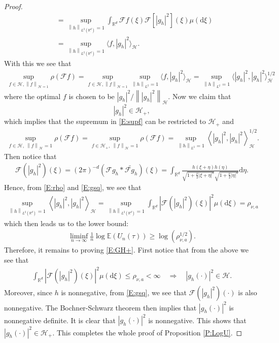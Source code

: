 \documentclass[a4paper,11pt]{article}
\numberwithin{equation}{section}
\numberwithin{equation}{section}
\theoremstyle{plain}
\theoremstyle{definition}
\newcommand{\ud}{\ensuremath{\mathrm{d} }}
\newcommand{\Norm}[1]{\left\|  #1   \right\|}
\newcommand{\R}{\mathbb{R}}
\begin{document}
\begin{proof}
\begin{align*}
                       & = \sup_{\Norm{h}_{L^2(\R^d)}=1} \int_{\R^d}\mathcal{F}f(\xi)\mathcal{F}[|g_h|^2](\xi) \mu(\ud \xi)                                   \\
                       & = \sup_{\Norm{h}_{L^2(\R^d)}=1}\langle f, |g_h|^2 \rangle _{\mathcal{H}}.
	\end{align*}
  With this we see that
	\begin{align}
		\label{E:supf}
		\sup_{ f\in \mathcal{H}, \Norm{f}_{\mathcal{H}=1} } \rho(\mathcal{F}f) = 	\sup_{ f\in \mathcal{H}, \Norm{f}_{\mathcal{H}=1} }\sup_{\Norm{h}_{L^2}=1} \langle f, |g_h|^2 \rangle _{\mathcal{H}} = \sup_{\Norm{h}_{L^2}=1} \langle |g_h|^2, |g_h|^2 \rangle^{1/2} _{\mathcal{H}}
	\end{align}
  where the optimal $f$ is chosen to be $|g_h|^2/\Norm{|g_h|^2}_{\mathcal{H}}$. Now we claim that
	\begin{equation}
		\label{E:GH+}
		|g_h|^2 \in \mathcal{H}_+,
	\end{equation}
  which implies that the supremum in \eqref{E:supf} can be restricted to $\mathcal{H}_+$ and
	\begin{align*}
		\sup_{ f \in \mathcal{H},\: \Norm{f}_{\mathcal{H}}=1 } \rho(\mathcal{F}f) =
		\sup_{ f \in \mathcal{H}_+,\: \Norm{f}_{\mathcal{H}}=1 } \rho(\mathcal{F}f) =
		\sup_{\Norm{h}_{L^2}=1} \left\langle |g_h|^2, |g_h|^2 \right\rangle^{1/2} _{\mathcal{H}}.
	\end{align*}
  Then notice that
	\begin{align}
		\label{E:gsq}
		\mathcal{F}( |g_h|^2 )(\xi) = (2\pi)^{-d} (\mathcal{F}g_h*\widetilde{\mathcal{F}g_h})(\xi)
                                = \int_{\R^d} \frac{h(\xi + \eta)h(\eta)}{\sqrt{1+\frac{\nu}{2}|\xi+\eta|^a}\sqrt{1+\frac{\nu}{2}|\eta|^a}} \ud \eta.
	\end{align}
  Hence, from \eqref{E:rho} and \eqref{E:gsq}, we see that
	\begin{align*}
		\sup_{ \Norm{h}_{L^2(\R^d)}=1 }\left\langle |g_h|^2, |g_h|^2 \right\rangle_{\mathcal{H}}
		=\sup_{ \Norm{h}_{L^2(\R^d)}=1 } \int_{\R^d} \left|\mathcal{F}( |g_h|^2 )(\xi)\right|^2 \mu(\ud \xi)
		= \rho_{\nu,a}
	\end{align*}
  which then leads us to the lower bound:
	\begin{align*}
		\liminf_{n\to \infty} \frac{1}{n} \log \mathbb{E} (U_n(\tau) ) \ge \log\left(\rho_{\nu,a}^{1/2}\right).
	\end{align*}
  Therefore, it remains to proving \eqref{E:GH+}. First notice that from the above we see that
	\begin{align*}
		\int_{\R^d} \left| \mathcal{F}\left(|g_h|^2\right)(\xi) \right|^2 \mu(\ud \xi) \le \rho_{\nu,a} < \infty
		\quad \Longrightarrow \quad |g_h(\cdot)|^2 \in \mathcal{H}.
	\end{align*}
  Moreover, since $h$ is nonnegative, from \eqref{E:gsq}, we see that
  $\mathcal{F}\left(|g_h|^2\right)(\cdot)$ is also nonnegative. The Bochner-Schwarz theorem then
  implies that $|g_h(\cdot)|^2$ is nonnegative definite. It is clear that $|g_h(\cdot)|^2$ is
  nonnegative. This shows that $|g_h(\cdot)|^2 \in \mathcal{H}_+$.  This completes the whole proof
  of Proposition \ref{P:LogU}.
\end{proof}
\end{document}
